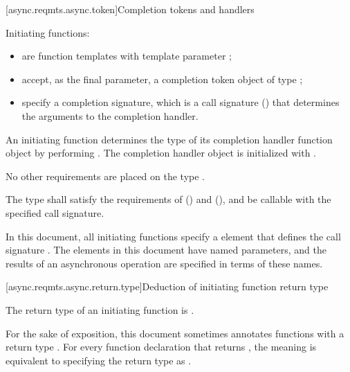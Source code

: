 [async.reqmts.async.token]{Completion tokens and handlers}

%
\pnum
Initiating functions:

\begin{itemize}
\item
are function templates with template parameter ;

%
\item
accept, as the final parameter, a completion token object  of type ;

%
\item
specify a completion signature, which is a call signature ()  that determines the arguments to the completion handler.
\end{itemize}

%
\pnum
An initiating function determines the type  of its
completion handler function object by performing
.
The completion handler object  is initialized with
.
\begin{note} No other requirements are placed on the type . \end{note}

\pnum
The type  shall satisfy the requirements of  () and  (), and be callable with the specified call signature.

\pnum
In this document, all initiating functions specify a
\completionsig element that defines the call signature .
The \completionsig elements in this document have named
parameters, and the results of an asynchronous operation are specified in
terms of these names.



[async.reqmts.async.return.type]{Deduction of initiating function return type}

%
\pnum
The return type of an initiating function is .

\pnum
For the sake of exposition, this document sometimes annotates functions with a return type \DEDUCED. For every function declaration that returns \DEDUCED, the meaning is equivalent to specifying the return type as .



